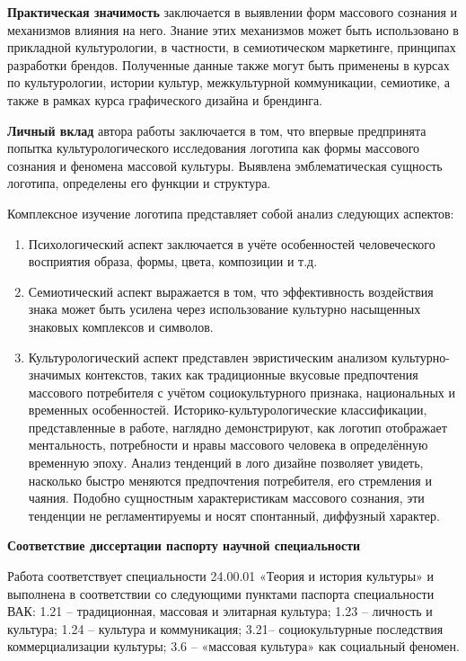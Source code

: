 \textbf{Практическая значимость} заключается в выявлении форм массового сознания и механизмов влияния на него. Знание этих механизмов может быть использовано в прикладной культурологии, в частности, в семиотическом маркетинге, принципах разработки брендов. Полученные данные также могут быть применены в курсах по культурологии, истории культур, межкультурной коммуникации, семиотике, а также в рамках курса графического дизайна и брендинга.

\textbf{Личный вклад} автора работы заключается в том, что впервые предпринята попытка культурологического исследования логотипа как формы массового сознания и феномена массовой культуры. Выявлена эмблематическая сущность логотипа, определены его функции и структура.

Комплексное изучение логотипа представляет собой анализ следующих аспектов:
\begin{enumerate}
\item Психологический аспект заключается в учёте особенностей человеческого восприятия образа, формы, цвета, композиции и т.д.
\item Семиотический аспект выражается в том, что эффективность воздействия знака может быть усилена через использование культурно насыщенных знаковых комплексов и символов.
\item Культурологический аспект представлен эвристическим анализом культурно-значимых контекстов, таких как традиционные вкусовые предпочтения массового потребителя с учётом социокультурного признака, национальных и временных особенностей. Историко-культурологические классификации, представленные в работе, наглядно демонстрируют, как логотип отображает ментальность, потребности и нравы массового человека в определённую временную эпоху. Анализ тенденций в лого дизайне позволяет увидеть, насколько быстро меняются предпочтения потребителя, его стремления и чаяния. Подобно сущностным характеристикам массового сознания, эти тенденции не регламентируемы и носят спонтанный, диффузный характер.
\end{enumerate}

\textbf{Соответствие диссертации паспорту научной специальности}

Работа соответствует специальности 24.00.01 «Теория и история культуры» и выполнена в соответствии со следующими пунктами паспорта специальности ВАК: 1.21 – традиционная, массовая и элитарная культура; 1.23 – личность и культура; 1.24 – культура и коммуникация; 3.21– социокультурные последствия коммерциализации культуры; 3.6 – «массовая культура» как социальный феномен.

